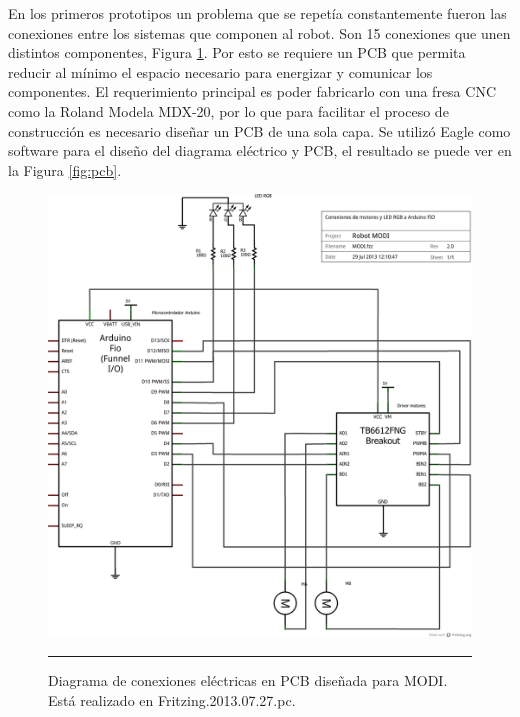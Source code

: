 En los primeros prototipos un problema que se repetía constantemente fueron las conexiones entre los sistemas que componen al robot. Son 15 conexiones que unen distintos componentes, Figura \ref{fig:Diagrama cables}. Por esto se requiere un PCB que permita reducir al mínimo el espacio necesario para energizar y comunicar los componentes. El requerimiento principal es poder fabricarlo con una fresa CNC como la Roland Modela MDX-20, por lo que para facilitar el proceso de construcción es necesario diseñar un PCB de una sola capa. Se utilizó Eagle como software para el diseño del diagrama eléctrico y PCB, el resultado se puede ver en la Figura \ref{fig:pcb}.


\begin{figure}[htbp]
	\centering
		\includegraphics[width=\textwidth]{./Figures/modi/MODI_schem.png}
		\rule{35em}{0.5pt}
	\caption[Diagrama eléctrico de conexiones en PCB MODI]{Diagrama de conexiones eléctricas en PCB diseñada para MODI. Está realizado en Fritzing.2013.07.27.pc.}
	\label{fig:Diagrama cables}
\end{figure}	


